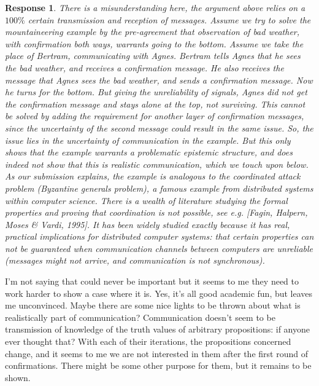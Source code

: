 \documentclass[a4paper]{article}
\newtheorem{response}{Response}
\begin{document}
\begin{response}
There is a misunderstanding here, the argument above relies on a $100\% $ certain transmission and reception of messages. Assume we try to solve the mountaineering example by the pre-agreement that observation of bad weather, with confirmation both ways, warrants going to the bottom. Assume we take the place of Bertram, communicating with Agnes. Bertram tells Agnes that he sees the bad weather, and receives a confirmation message. He also receives the message that Agnes sees the bad weather, and sends a confirmation message. Now he turns for the bottom. But giving the unreliability of signals, Agnes did not get the confirmation message and stays alone at the top, not surviving. This cannot be solved by adding the requirement for another layer of confirmation messages, since the uncertainty of the second message could result in the same issue. So, the issue lies in the uncertainty of communication in the example. But this only shows that the example warrants a problematic epistemic structure, and does indeed not show that this is realistic communication, which we touch upon below. As our submission explains, the example is analogous to the coordinated attack problem (Byzantine generals problem), a famous example from distributed systems within computer science. There is a wealth of literature studying the formal properties and proving that coordination is not possible, see e.g. [Fagin, Halpern, Moses \& Vardi, 1995]. It has been widely studied exactly because it has real, practical implications for distributed computer systems: that certain properties can not be guaranteed when communication channels between computers are unreliable (messages might not arrive, and communication is not synchronous).
\end{response}

I'm not saying that could never be important but it seems to me they need to work harder to show a case where it is. Yes, it's all good academic fun, but leaves me unconvinced. Maybe there are some nice lights to be thrown about what is realistically part of communication? Communication doesn't seem to be transmission of knowledge of the truth values of arbitrary propositions: if anyone ever thought that? With each of their iterations, the propositions concerned change, and it seems to me we are not interested in them after the first round of confirmations. There might be some other purpose for them, but it remains to be shown.
\end{document}
